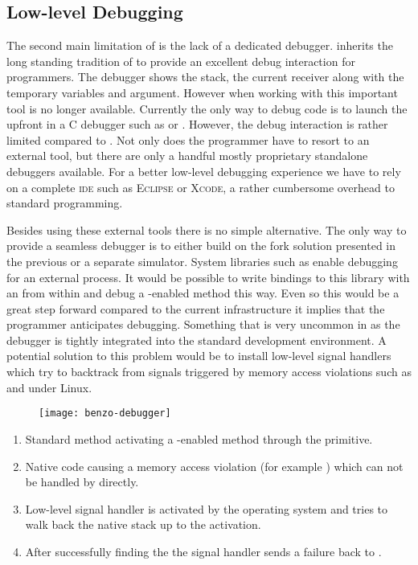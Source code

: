 \subsection{Low-level Debugging}
The second main limitation of \B is the lack of a dedicated debugger.
\PH inherits the long standing tradition of \ST to provide an excellent debug interaction for programmers.
The \PH debugger shows the stack, the current receiver along with the temporary variables and argument.
However when working with \B this important tool is no longer available.
Currently the only way to debug \B code is to launch the \VM upfront in a C debugger such as \GDB or \LLDB.
However, the debug interaction is rather limited compared to \PH.
Not only does the programmer have to resort to an external tool, but there are only a handful mostly proprietary standalone debuggers available.
For a better low-level debugging experience we have to rely on a complete \textsc{ide} such as \textsc{Eclipse} or \textsc{Xcode}, a rather cumbersome overhead to standard \PH programming.

Besides using these external tools there is no simple alternative.
The only way to provide a seamless debugger is to either build on the fork solution presented in the previous  or a separate simulator.
System libraries such as \ptrace enable debugging for an external process.
It would be possible to write bindings to this library with an \FFI from within \PH and debug a \B-enabled method this way.
Even so this would be a great step forward compared to the current infrastructure it implies that the programmer anticipates debugging.
Something that is very uncommon in \PH as the debugger is tightly integrated into the standard development environment.
A potential solution to this problem would be to install low-level signal handlers which try to backtrack from signals triggered by memory access violations such as  and  under Linux.

\begin{figure}[h]
	\centering
	\texttt{[image: benzo-debugger]}
\end{figure}
\begin{enumerate}
	\item Standard \PH method activating a \B-enabled method through the  primitive.
	\item Native code causing a memory access violation (for example ) which can not be handled by \PH directly.
	\item Low-level signal handler is activated by the operating system and tries to walk back the native stack up to the  activation.
	\item After successfully finding the  the signal handler sends a \B failure back to \PH.
\end{enumerate}


